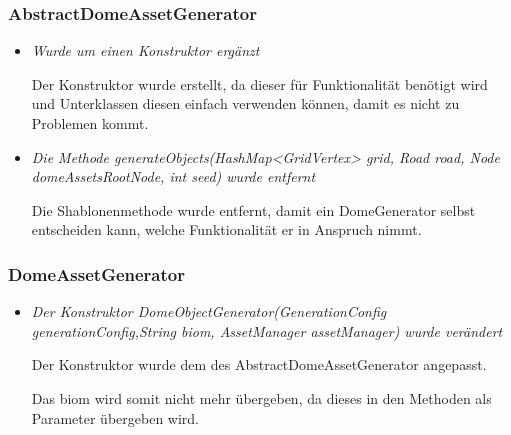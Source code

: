 \subsubsection{AbstractDomeAssetGenerator}
\begin{itemize}
    \item \textit{Wurde um einen Konstruktor ergänzt}
        \begin{leftbar}[0.9\linewidth]
            Der Konstruktor wurde erstellt, da dieser für Funktionalität benötigt wird und Unterklassen diesen einfach verwenden können,
            damit es nicht zu Problemen kommt.
        \end{leftbar}

    \item \textit{Die Methode generateObjects(HashMap<GridVertex> grid, Road road, Node domeAssetsRootNode, int seed) wurde entfernt}
        \begin{leftbar}[0.9\linewidth]
            Die Shablonenmethode wurde entfernt, damit ein DomeGenerator selbst entscheiden kann, welche Funktionalität er in Anspruch nimmt.
        \end{leftbar}
    
\end{itemize}

\subsubsection{DomeAssetGenerator}
\begin{itemize}
    \item \textit{Der Konstruktor DomeObjectGenerator(GenerationConfig generationConfig,String biom, AssetManager assetManager) wurde verändert}
        \begin{leftbar}[0.9\linewidth]
            Der Konstruktor wurde dem des AbstractDomeAssetGenerator angepasst.\par

            Das biom wird somit nicht mehr übergeben, da dieses in den Methoden als Parameter übergeben wird.
        \end{leftbar}
    
\end{itemize}


